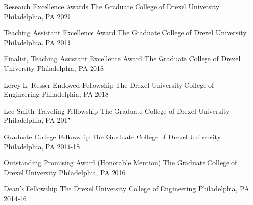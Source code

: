 



\begin{cvhonors}
  \cvhonor
    {Research Excellence Awards} %
    {The Graduate College of Drexel University} %
    {Philadelphia, PA} %
    {2020} %
    
  \cvhonor
    {Teaching Assistant Excellence Award} %
    {The Graduate College of Drexel University} %
    {Philadelphia, PA} %
    {2019} %
    
  \cvhonor
    {Finalist, Teaching Assistant Excellence Award} %
    {The Graduate College of Drexel University} %
    {Philadelphia, PA} %
    {2018} %

  \cvhonor
    {Lerey L. Resser Endowed Fellowship} %
    {The Drexel University College of Engineering} %
    {Philadelphia, PA} %
    {2018} %

  \cvhonor
    {Lee Smith Traveling Fellowship} %
    {The Graduate College of Drexel University} %
    {Philadelphia, PA} %
    {2017} %

  \cvhonor
    {Graduate College Fellowship} %
    {The Graduate College of Drexel University} %
    {Philadelphia, PA} %
    {2016-18} %


  \cvhonor
    {Outstanding Promising Award (Honorable Mention)} %
    {The Graduate College of Drexel University} %
    {Philadelphia, PA} %
    {2016} %
    

  \cvhonor
    {Dean's Fellowship} %
    {The Drexel University College of Engineering} %
    {Philadelphia, PA} %
    {2014-16} %
    

\end{cvhonors}


